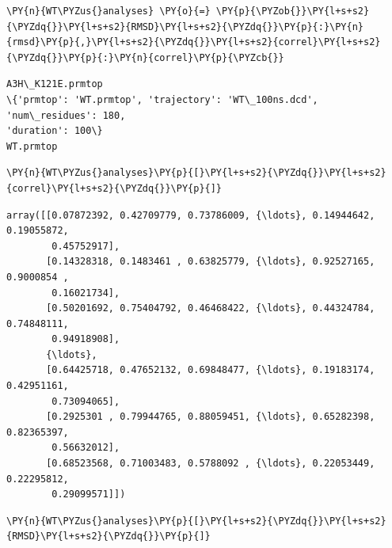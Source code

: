 \begin{tcolorbox}[breakable, size=fbox, boxrule=1pt, pad at break*=1mm,colback=cellbackground, colframe=cellborder]
\begin{Verbatim}[commandchars=\\\{\}]
\PY{n}{WT\PYZus{}analyses} \PY{o}{=} \PY{p}{\PYZob{}}\PY{l+s+s2}{\PYZdq{}}\PY{l+s+s2}{RMSD}\PY{l+s+s2}{\PYZdq{}}\PY{p}{:}\PY{n}{rmsd}\PY{p}{,}\PY{l+s+s2}{\PYZdq{}}\PY{l+s+s2}{correl}\PY{l+s+s2}{\PYZdq{}}\PY{p}{:}\PY{n}{correl}\PY{p}{\PYZcb{}}
\end{Verbatim}
\end{tcolorbox}

    \begin{Verbatim}[commandchars=\\\{\}]
A3H\_K121E.prmtop
\{'prmtop': 'WT.prmtop', 'trajectory': 'WT\_100ns.dcd', 'num\_residues': 180,
'duration': 100\}
WT.prmtop
    \end{Verbatim}

    \begin{tcolorbox}[breakable, size=fbox, boxrule=1pt, pad at break*=1mm,colback=cellbackground, colframe=cellborder]
\begin{Verbatim}[commandchars=\\\{\}]
\PY{n}{WT\PYZus{}analyses}\PY{p}{[}\PY{l+s+s2}{\PYZdq{}}\PY{l+s+s2}{correl}\PY{l+s+s2}{\PYZdq{}}\PY{p}{]}
\end{Verbatim}
\end{tcolorbox}

            \begin{tcolorbox}[breakable, size=fbox, boxrule=.5pt, pad at break*=1mm, opacityfill=0]
\begin{Verbatim}[commandchars=\\\{\}]
array([[0.07872392, 0.42709779, 0.73786009, {\ldots}, 0.14944642, 0.19055872,
        0.45752917],
       [0.14328318, 0.1483461 , 0.63825779, {\ldots}, 0.92527165, 0.9000854 ,
        0.16021734],
       [0.50201692, 0.75404792, 0.46468422, {\ldots}, 0.44324784, 0.74848111,
        0.94918908],
       {\ldots},
       [0.64425718, 0.47652132, 0.69848477, {\ldots}, 0.19183174, 0.42951161,
        0.73094065],
       [0.2925301 , 0.79944765, 0.88059451, {\ldots}, 0.65282398, 0.82365397,
        0.56632012],
       [0.68523568, 0.71003483, 0.5788092 , {\ldots}, 0.22053449, 0.22295812,
        0.29099571]])
\end{Verbatim}
\end{tcolorbox}
        
    \begin{tcolorbox}[breakable, size=fbox, boxrule=1pt, pad at break*=1mm,colback=cellbackground, colframe=cellborder]
\begin{Verbatim}[commandchars=\\\{\}]
\PY{n}{WT\PYZus{}analyses}\PY{p}{[}\PY{l+s+s2}{\PYZdq{}}\PY{l+s+s2}{RMSD}\PY{l+s+s2}{\PYZdq{}}\PY{p}{]}
\end{Verbatim}
\end{tcolorbox}

